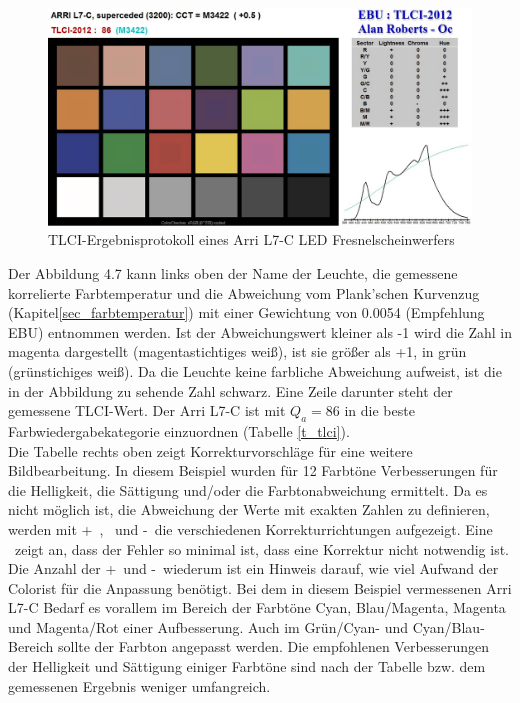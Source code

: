 \begin{figure}[htp]     %
\centering
\includegraphics[width=1.0\textwidth]{bilder/tlci2} 
\caption {TLCI-Ergebnisprotokoll eines Arri L7-C LED Fresnelscheinwerfers\protect\footnotemark}\label{b_tlci2}
\end{figure}
\noindent Der Abbildung 4.7 kann links oben der Name der Leuchte, die gemessene korrelierte Farbtemperatur und die Abweichung vom Plank'schen Kurvenzug (Kapitel\ref{sec_farbtemperatur}) mit einer Gewichtung von 0.0054 (Empfehlung EBU) entnommen werden. Ist der Abweichungswert kleiner als -1 wird die Zahl in magenta dargestellt (magentastichtiges weiß), ist sie größer als +1, in grün (grünstichiges weiß). Da die Leuchte keine farbliche Abweichung aufweist, ist die in der Abbildung zu sehende Zahl schwarz. Eine Zeile darunter steht der gemessene TLCI-Wert. Der Arri L7-C ist mit $Q_{a}=86$ in die beste Farbwiedergabekategorie einzuordnen (Tabelle \ref{t_tlci}).\\
Die Tabelle rechts oben zeigt Korrekturvorschläge für eine weitere Bildbearbeitung. In diesem Beispiel wurden für 12 Farbtöne Verbesserungen für die Helligkeit, die Sättigung und/oder die Farbtonabweichung ermittelt. Da es nicht möglich ist, die Abweichung der Werte mit exakten Zahlen zu definieren, werden mit \glqq +\grqq\ , \grqq\ und \glqq -\grqq\ die verschiedenen Korrekturrichtungen aufgezeigt. Eine \grqq\ zeigt an, dass der Fehler so minimal ist, dass eine Korrektur nicht notwendig ist. Die Anzahl der \glqq +\grqq\ und \glqq -\grqq\ wiederum ist ein Hinweis darauf, wie viel Aufwand der Colorist für die Anpassung benötigt. Bei dem in diesem Beispiel vermessenen Arri L7-C Bedarf es vorallem im Bereich der Farbtöne Cyan, Blau/Magenta, Magenta und Magenta/Rot einer Aufbesserung. Auch im Grün/Cyan- und Cyan/Blau-Bereich sollte der Farbton angepasst werden. Die empfohlenen Verbesserungen der Helligkeit und Sättigung einiger Farbtöne sind nach der Tabelle bzw. dem gemessenen Ergebnis weniger umfangreich.\\
